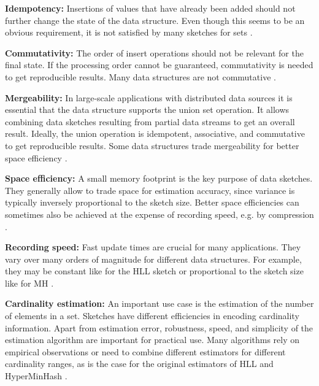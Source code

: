 \documentclass[sigconf, nonacm]{acmart}
\begin{document}
\noindent\textbf{Idempotency:} Insertions of values that have already been added should not further change the state of the data structure. Even though this seems to be an obvious requirement, it is not satisfied by many sketches for sets \cite{Chen2011, Mitzenmacher2014, Qi2020, Wang2019, Xiao2020}.

\noindent\textbf{Commutativity:}
The order of insert operations should not be relevant for the final state. If the processing order cannot be guaranteed, commutativity is needed to get reproducible results. Many data structures are not commutative \cite{Helmi2012, Cohen2015, Ting2014}.

\noindent\textbf{Mergeability:}
In large-scale applications with distributed data sources it is essential that the data structure supports the union set operation. It allows combining data sketches resulting from partial data streams to get an overall result.  Ideally, the union operation is idempotent, associative, and commutative to get reproducible results. Some data structures trade mergeability for better space efficiency \cite{Cohen2015, Ting2014, Chen2011}.

\noindent\textbf{Space efficiency:}
A small memory footprint is the key purpose of data sketches. They generally allow to trade space for estimation accuracy, since variance is typically inversely proportional to the sketch size. Better space efficiencies can sometimes also be achieved at the expense of recording speed, e.g. by compression \cite{Durand2004,Scheuermann2007,Lang2017}.

\noindent\textbf{Recording speed:}
Fast update times are crucial for many applications. They vary over many orders of magnitude for different data structures. For example, they may be constant like for the \ac{HLL} sketch \cite{Flajolet2007} or proportional to the sketch size like for \ac{MH} \cite{Broder1997}.

\noindent\textbf{Cardinality estimation:}
An important use case is the estimation of the number of elements in a set. Sketches have different efficiencies in encoding cardinality information. Apart from estimation error, robustness, speed, and simplicity of the estimation algorithm are important for practical use. Many algorithms rely on empirical observations \cite{Heule2013} or need to combine different estimators for different cardinality ranges, as is the case for the original estimators of \ac{HLL} \cite{Flajolet2007} and HyperMinHash \cite{Yu2020}.
\end{document}
